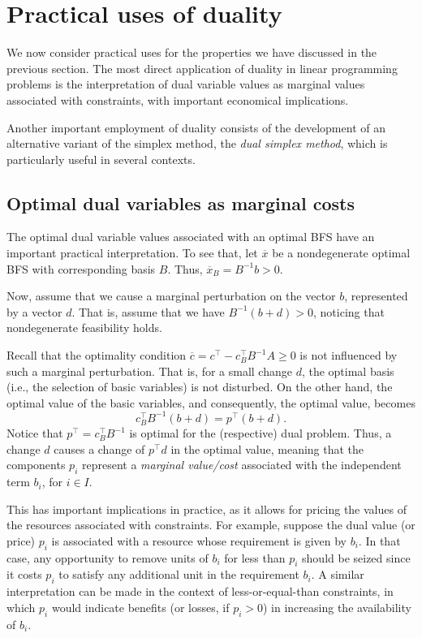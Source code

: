 \section{Practical uses of duality}

We now consider practical uses for the properties we have discussed in the previous section. The most direct application of duality in linear programming problems is the interpretation of dual variable values as marginal values associated with constraints, with important economical implications. 

Another important employment of duality consists of the development of an alternative variant of the simplex method, the \emph{dual simplex method}, which is particularly useful in several contexts.



\subsection{Optimal dual variables as marginal costs}

The optimal dual variable values associated with an optimal BFS have an important practical interpretation. To see that, let $\overline{x}$ be a nondegenerate optimal BFS with corresponding basis $B$. Thus, $\overline{x}_B = B^{-1}b > 0$.

Now, assume that we cause a marginal perturbation on the vector $b$, represented by a vector $d$. That is, assume that we have $B^{-1}(b + d) > 0$, noticing that nondegenerate feasibility holds.

Recall that the optimality condition $\overline{c} = c^\top - c_B ^\top B^{-1}A \geq 0$ is not influenced by such a marginal perturbation. That is, for a small change $d$, the optimal basis (i.e., the selection of basic variables) is not disturbed. On the other hand, the optimal value of the basic variables, and consequently, the optimal value, becomes
%
\begin{equation*}
	c_B^\top B^{-1}(b + d) = p^\top(b + d). 
\end{equation*}
%
Notice that $p^\top = c_B^\top B^{-1}$ is optimal for the (respective) dual problem. Thus, a change $d$ causes a change of $p^\top d$ in the optimal value, meaning that the components $p_i$ represent a \emph{marginal value/cost} associated with the independent term $b_i$, for $i \in I$. 

This has important implications in practice, as it allows for pricing the values of the resources associated with constraints. For example, suppose the dual value (or price) $p_i$ is associated with a resource whose requirement is given by $b_i$. In that case, any opportunity to remove units of $b_i$ for less than $p_i$ should be seized since it costs $p_i$ to satisfy any additional unit in the requirement $b_i$. A similar interpretation can be made in the context of less-or-equal-than constraints, in which $p_i$ would indicate benefits (or losses, if $p_i > 0$) in increasing the availability of $b_i$. 

